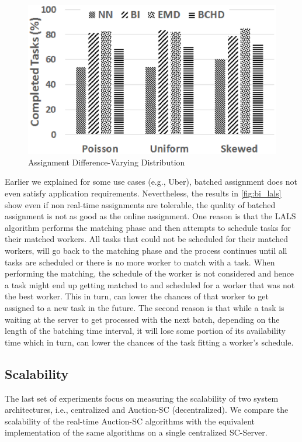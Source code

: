 \begin{figure}[h]
	\centering
	\includegraphics[width=0.75\columnwidth]{figures/dists.eps}
	\vspace{-0.1in}
	\caption{Assignment Difference-Varying Distribution}\label{fig:dists}
\end{figure}

Earlier we explained for some use cases (e.g., Uber), batched assignment does not even satisfy application requirements. Nevertheless, the results in \cref{fig:bi_lals} show even if non real-time assignments are tolerable, the quality of batched assignment is not as good as the online assignment. One reason is that the LALS algorithm performs the matching phase and then attempts to schedule tasks for their matched workers. All tasks that could not be scheduled for their matched workers, will go back to the matching phase and the process continues until all tasks are scheduled or there is no more worker to match with a task. When performing the matching, the schedule of the worker is not considered and hence a task might end up getting matched to and scheduled for a worker that was not the best worker. This in turn, can lower the chances of that worker to get assigned to a new task in the future. The second reason is that while a task is waiting at the server to get processed with the next batch, depending on the length of the batching time interval, it will lose some portion of its availability time which in turn, can lower the chances of the task fitting a worker's schedule.

\subsection{Scalability}
\label{subsec:exp_scale}
The last set of experiments focus on measuring the scalability of two system architectures, i.e., centralized and Auction-SC (decentralized). We compare the scalability of the real-time Auction-SC algorithms with the equivalent implementation of the same algorithms on a single centralized SC-Server. 

